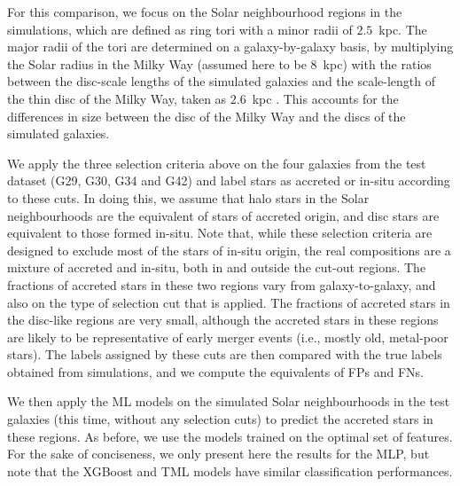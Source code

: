For this comparison, we focus on the Solar neighbourhood regions in the simulations, which are defined as ring tori with a minor radii of $2.5$~kpc. The major radii of the tori are determined on a galaxy-by-galaxy basis, by multiplying the Solar radius in the Milky Way (assumed here to be $8$~kpc) with the ratios between the disc-scale lengths of the simulated galaxies and the scale-length of the thin disc of the Milky Way, taken as $2.6$~kpc \citep{BlandHawthorn2016}. This accounts for the differences in size between the disc of the Milky Way and the discs of the simulated galaxies.

We apply the three selection criteria above on the four galaxies from the test dataset (G29, G30, G34 and G42) and label stars as accreted or in-situ according to these cuts. In doing this, we assume that halo stars in the Solar neighbourhoods are the equivalent of stars of accreted origin, and disc stars are equivalent to those formed in-situ. Note that, while these selection criteria are designed to exclude most of the stars of in-situ origin, the real compositions are a mixture of accreted and in-situ, both in and outside the cut-out regions. The fractions of accreted stars in these two regions vary from galaxy-to-galaxy, and also on the type of selection cut that is applied. The fractions of accreted stars in the disc-like regions are very small, although the accreted stars in these regions are likely to be representative of early merger events (i.e., mostly old, metal-poor stars). The labels assigned by these cuts are then compared with the true labels obtained from simulations, and we compute the equivalents of FPs and FNs.

We then apply the ML models on the simulated Solar neighbourhoods in the test galaxies (this time, without any selection cuts) to predict the accreted stars in these regions. As before, we use the models trained on the optimal set of features. For the sake of conciseness, we only present here the results for the MLP, but note that the XGBoost and TML models have similar classification performances.

